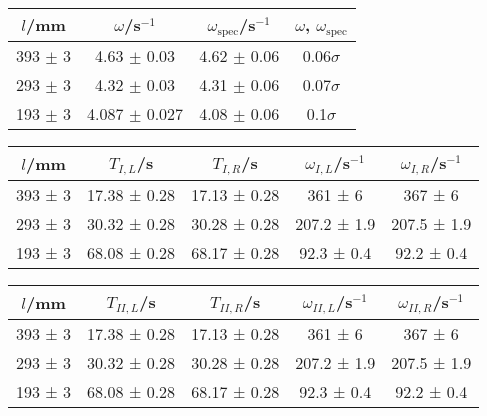 \documentclass[12pt,a4paper,german]{scrartcl}
\begin{document}
  \begin{center}
    \begin{tabular}{c|c|c|c}
      $l$/mm & $\omega$/s$^{-1}$ & $\omega_\text{spec}$/s$^{-1}$ & $\omega$, $\omega_\text{spec}$ \\
      \hline
      393 $\pm$ 3 & 4.63 $\pm$ 0.03   & 4.62 $\pm$ 0.06 & 0.06$\sigma$ \\
      293 $\pm$ 3 & 4.32 $\pm$ 0.03   & 4.31 $\pm$ 0.06 & 0.07$\sigma$ \\
      193 $\pm$ 3 & 4.087 $\pm$ 0.027 & 4.08 $\pm$ 0.06 & 0.1$\sigma$
    \end{tabular}
    \label{table_asym_omega}
  \end{center}

  \begin{center}
    \begin{tabular}{c|c|c|c|c}
      $l$/mm & $T_{I,L}$/s & $T_{I,R}$/s & $\omega_{I,L}$/s$^{-1}$ & $\omega_{I,R}$/s$^{-1}$ \\
      \hline
      393 ± 3 & 17.38 ± 0.28 & 17.13 ± 0.28 &   361 ± 6   &   367 ± 6   \\
      293 ± 3 & 30.32 ± 0.28 & 30.28 ± 0.28 & 207.2 ± 1.9 & 207.5 ± 1.9 \\
      193 ± 3 & 68.08 ± 0.28 & 68.17 ± 0.28 &  92.3 ± 0.4 &  92.2 ± 0.4
    \end{tabular}
    \label{table_beats_T_omega_left_right}
  \end{center}

  \begin{center}
    \begin{tabular}{c|c|c|c|c}
      $l$/mm & $T_{II,L}$/s & $T_{II,R}$/s & $\omega_{II,L}$/s$^{-1}$ & $\omega_{II,R}$/s$^{-1}$ \\
      \hline
      393 ± 3 & 17.38 ± 0.28 & 17.13 ± 0.28 &   361 ± 6   &   367 ± 6   \\
      293 ± 3 & 30.32 ± 0.28 & 30.28 ± 0.28 & 207.2 ± 1.9 & 207.5 ± 1.9 \\
      193 ± 3 & 68.08 ± 0.28 & 68.17 ± 0.28 &  92.3 ± 0.4 &  92.2 ± 0.4
    \end{tabular}
    \label{table_beats_T_omega_beat_left_right}
  \end{center}
\end{document}
